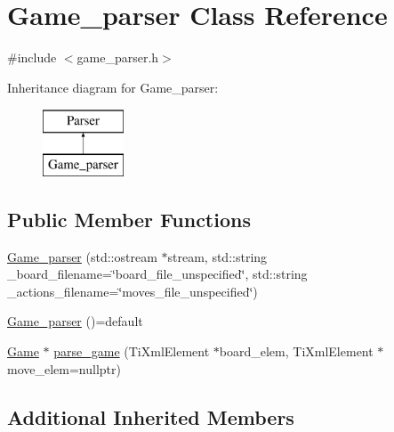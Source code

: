 \hypertarget{class_game__parser}{\section{Game\-\_\-parser Class Reference}
\label{class_game__parser}
}


{\ttfamily \#include $<$game\-\_\-parser.\-h$>$}

Inheritance diagram for Game\-\_\-parser\-:\begin{figure}[H]
\begin{center}
\leavevmode
\includegraphics[height=2.000000cm]{class_game__parser}
\end{center}
\end{figure}
\subsection*{Public Member Functions}
\begin{DoxyCompactItemize}
\item 
\hyperlink{class_game__parser_ac871d4fd670b2b92c1ab27bbb2127e23}{Game\-\_\-parser} (std\-::ostream $\ast$stream, std\-::string \-\_\-board\-\_\-filename=\char`\"{}board\-\_\-file\-\_\-unspecified\char`\"{}, std\-::string \-\_\-actions\-\_\-filename=\char`\"{}moves\-\_\-file\-\_\-unspecified\char`\"{})
\item 
\hyperlink{class_game__parser_a2c346a615028b9cf26f7560620967a71}{Game\-\_\-parser} ()=default
\item 
\hyperlink{class_game}{Game} $\ast$ \hyperlink{class_game__parser_ad90be9cf48e0a2f99f7e526fab3fe33c}{parse\-\_\-game} (Ti\-Xml\-Element $\ast$board\-\_\-elem, Ti\-Xml\-Element $\ast$move\-\_\-elem=nullptr)
\end{DoxyCompactItemize}
\subsection*{Additional Inherited Members}


